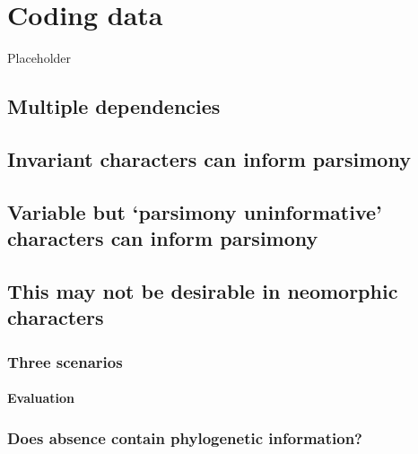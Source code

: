 \documentclass[]{book}
\theoremstyle{definition}
\theoremstyle{definition}
\theoremstyle{definition}
\theoremstyle{remark}
\begin{document}
\hypertarget{coding}{%
\chapter{Coding data}\label{coding}}

Placeholder

\hypertarget{multiple-dependencies}{%
\section{Multiple dependencies}\label{multiple-dependencies}}

\hypertarget{invariant-characters-can-inform-parsimony}{%
\section{Invariant characters can inform
parsimony}\label{invariant-characters-can-inform-parsimony}}

\hypertarget{puip}{%
\section{Variable but `parsimony uninformative' characters can inform
parsimony}\label{puip}}

\hypertarget{this-may-not-be-desirable-in-neomorphic-characters}{%
\section{This may not be desirable in neomorphic
characters}\label{this-may-not-be-desirable-in-neomorphic-characters}}

\hypertarget{three-scenarios}{%
\subsection{Three scenarios}\label{three-scenarios}}

\hypertarget{evaluation}{%
\subsubsection{Evaluation}\label{evaluation}}

\hypertarget{does-absence-contain-phylogenetic-information}{%
\subsection{Does absence contain phylogenetic
information?}\label{does-absence-contain-phylogenetic-information}}
\end{document}
